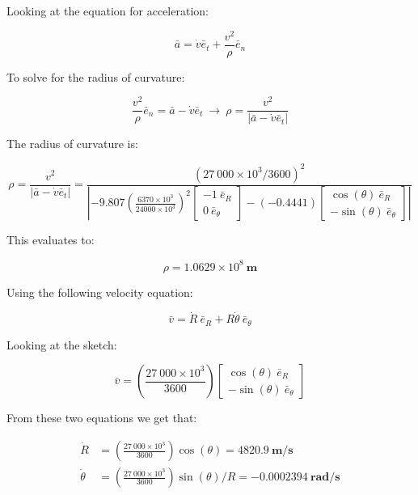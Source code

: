 \documentclass[12pt, letterpaper]{../assignment}
\begin{document}
Looking at the equation for acceleration:

$$ \bar{a} = \dot{v} \bar{e}_t + \frac{v^2}{\rho}\bar{e}_n $$

To solve for the radius of curvature:

$$ \frac{v^2}{\rho}\bar{e}_n = \bar{a} -\dot{v} \bar{e}_t \ \rightarrow
\ \rho = \frac{v^2}{|\bar{a} -\dot{v} \bar{e}_t|} $$

The radius of curvature is:

$$ \rho = \frac{v^2}{|\bar{a} -\dot{v} \bar{e}_t|} =
\frac{\left(27\ 000 \times 10^3/3600\right)^2}{\left|-9.807\left(\frac{6370 \times 10^3}{24000 \times 10^3}\right)^2
\left[\begin{array}{rr} -1\ \bar{e}_R\\ 0 \ \bar{e}_\theta \end{array}\right] -\left(-0.4441\right) 
\left[\begin{array}{c} \cos\left(\theta \right) \ \bar{e}_R \\ -\sin\left(\theta \right)\ \bar{e}_\theta \end{array}\right]\right|}
$$

This evaluates to:

\begin{answer}
$$ \rho = 1.0629 \times 10^8 \ \textbf{m}  $$
\end{answer}


Using the following velocity equation:

$$ \bar{v} = \dot{R}\ \bar{e}_R + R \dot{\theta}\ \bar{e}_\theta $$

Looking at the sketch:

$$ \bar{v} = \left(\frac{27\ 000 \times 10^3}{3600}\right)
\left[\begin{array}{c} \cos\left(\theta \right) \ \bar{e}_R \\ -\sin\left(\theta \right)\ \bar{e}_\theta \end{array}\right]$$

From these two equations we get that:

\begin{answer}
\begin{equation*}
    \begin{aligned}
        \dot{R} &= \left(\frac{27\ 000 \times 10^3}{3600}\right)\cos\left(\theta \right)
        = 4820.9  \ \textbf{m}/\textbf{s}\\
        \dot{\theta}& = \left(\frac{27\ 000 \times 10^3}{3600}\right)\sin\left(\theta \right)/R
        = -0.0002394  \ \textbf{rad}/\textbf{s}
    \end{aligned}
\end{equation*}
\end{answer}
\end{document}
